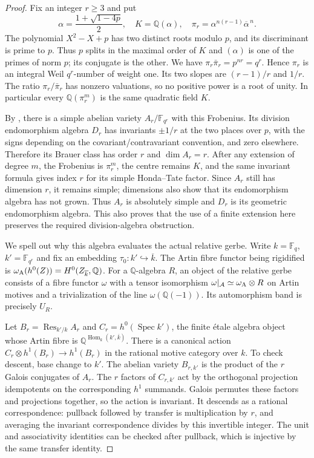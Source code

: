\begin{proof}
Fix an integer $r\geq3$ and put
\[
 \alpha=\frac{1+\sqrt{1-4p}}2,\quad K=\mathbb Q(\alpha),\quad
 \pi_r=\alpha^{n(r-1)}\overline\alpha^{\,n}.
 \tag{D.7}
\]
The polynomial $X^2-X+p$ has two distinct roots modulo $p$, and its
discriminant is prime to $p$. Thus $p$ splits in the maximal order of
$K$ and $(\alpha)$ is one of the primes of norm $p$; its conjugate is
the other. We have $\pi_r\bar\pi_r=p^{nr}=q^r$. Hence $\pi_r$ is an
integral Weil $q^r$-number of weight one. Its two slopes are
$(r-1)/r$ and $1/r$. The ratio $\pi_r/\bar\pi_r$ has nonzero valuations,
so no positive power is a root of unity. In particular every
$\mathbb Q(\pi_r^m)$ is the same quadratic field $K$.

By \citet[Th\'eor\`eme 1(i)--(ii), p.~96]{D_Tate1971}, there is a simple
abelian variety $A_r/\mathbb F_{q^r}$ with this Frobenius. Its division
endomorphism algebra $D_r$ has invariants $\pm1/r$ at the two places over
$p$, with the signs depending on the covariant/contravariant convention,
and zero elsewhere. Therefore its Brauer class has order $r$ and
$\dim A_r=r$. After any extension of degree $m$, the Frobenius is
$\pi_r^m$, the centre remains $K$, and the same invariant formula gives
index $r$ for its simple Honda--Tate factor. Since $A_r$ still has dimension
$r$, it remains simple; dimensions also show that its endomorphism algebra
has not grown. Thus $A_r$ is absolutely simple and $D_r$ is its geometric
endomorphism algebra. This also proves that the use of a finite extension
here preserves the required division-algebra obstruction.

We spell out why this algebra evaluates the actual relative gerbe.
Write $k=\mathbb F_q$, $k'=\mathbb F_{q^r}$ and fix an embedding
$\tau_0:k'\hookrightarrow\overline k$. The Artin fibre functor being
rigidified is
$\omega_{\rm A}(h^0(Z))=H^0(Z_{\overline k},\mathbb Q)$.
For a $\mathbb Q$-algebra $R$, an object of the relative gerbe consists
of a fibre functor $\omega$ with a tensor isomorphism
$\omega|_{\mathcal A}\simeq\omega_{\rm A}\otimes R$ on Artin motives
and a trivialization of the line $\omega(\mathbb Q(-1))$.
Its automorphism band is precisely $U_R$.

Let $B_r=\operatorname{Res}_{k'/k}A_r$ and
$C_r=h^0(\operatorname{Spec}k')$, the finite \'etale algebra object
whose Artin fibre is $\mathbb Q^{\operatorname{Hom}_k(k',\overline k)}$.
There is a canonical action
$C_r\otimes h^1(B_r)\to h^1(B_r)$ in the rational motive category
over $k$. To check descent, base change to $k'$. The abelian variety
$B_{r,k'}$ is the product of the $r$ Galois conjugates of $A_r$.
The $r$ factors of $C_{r,k'}$ act by the orthogonal projection
idempotents on the corresponding $h^1$ summands. Galois permutes
these factors and projections together, so the action is invariant.
It descends as a rational correspondence: pullback followed by
transfer is multiplication by $r$, and averaging the invariant
correspondence divides by this invertible integer. The unit and
associativity identities can be checked after pullback, which is
injective by the same transfer identity.


\end{proof}
